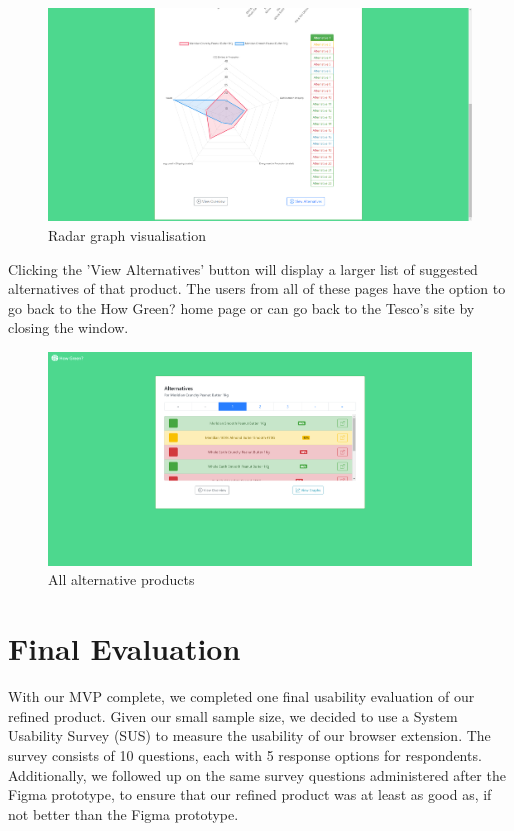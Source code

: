 \documentclass[a4,10pt,twocolumn]{article}
\begin{document}
\begin{figure}[h]
    \centering
    \includegraphics[width=0.9\columnwidth]{assets/final/visualisations_2.png}
    \caption{Radar graph visualisation}
\end{figure}

Clicking the 'View Alternatives' button will display a larger list of suggested alternatives of that product. The users from all of these pages have the option to go back to the How Green? home page or can go back to the Tesco's site by closing the window. 

\begin{figure}[h]
    \centering
    \includegraphics[width=0.9\columnwidth]{assets/final/product_alternatives_view_more.png}
    \caption{All alternative products}
\end{figure}


\section*{Final Evaluation}
With our MVP complete, we completed one final usability evaluation of our refined product. Given our small sample size, we decided to use a System Usability Survey (SUS) to measure the usability of our browser extension. The survey consists of 10 questions, each with 5 response options for respondents. Additionally, we followed up on the same survey questions administered after the Figma prototype, to ensure that our refined product was at least as good as, if not better than the Figma prototype.
\end{document}
